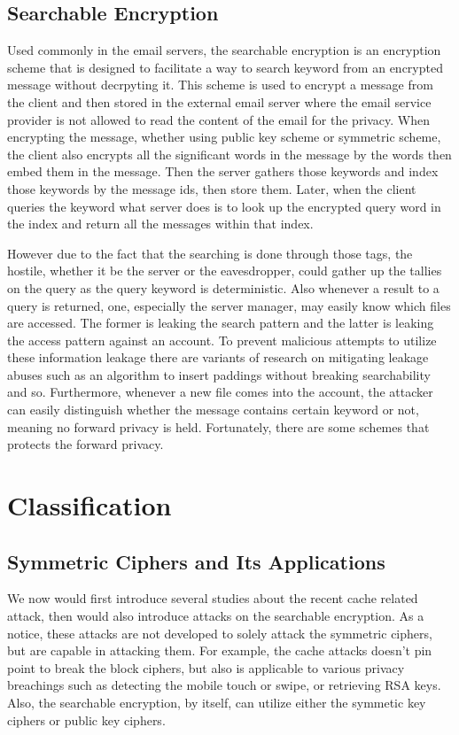 \documentclass[a4paper]{article}
\begin{document}
\subsection{Searchable Encryption}

Used commonly in the email servers, the searchable encryption \cite{curtmola2011searchable} is an encryption scheme that is designed to facilitate a way to search keyword from an encrypted message without decrpyting it. This scheme is used to encrypt a message from the client and then stored in the external email server where the email service provider is not allowed to read the content of the email for the privacy. When encrypting the message, whether using public key scheme or symmetric scheme, the client also encrypts all the significant words in the message by the words then embed them in the message. Then the server gathers those keywords and index those keywords by the message ids, then store them. Later, when the client queries the keyword what server does is to look up the encrypted query word in the index and return all the messages within that index.
\par However due to the fact that the searching is done through those tags, the hostile, whether it be the server or the eavesdropper, could gather up the tallies on the query as the query keyword is deterministic. Also whenever a result to a query is returned, one, especially the server manager, may easily know which files are accessed. The former is leaking the search pattern and the latter is leaking the access pattern against an account. To prevent malicious attempts to utilize these information leakage there are variants of research on mitigating leakage abuses such as an algorithm to insert paddings without breaking searchability and so. Furthermore, whenever a new file comes into the account, the attacker can easily distinguish whether the message contains certain keyword or not, meaning no forward privacy is held. Fortunately, there are some schemes that protects the forward privacy.

\section{Classification}

\subsection{Symmetric Ciphers and Its Applications}

We now would first introduce several studies about the recent cache related attack, then would also introduce attacks on the searchable encryption. As a notice, these attacks are not developed to solely attack the symmetric ciphers, but are capable in attacking them. For example, the cache attacks doesn't pin point to break the block ciphers, but also is applicable to various privacy breachings such as detecting the mobile touch or swipe, or retrieving RSA keys. Also, the searchable encryption, by itself, can utilize either the symmetic key ciphers or public key ciphers.
\end{document}
